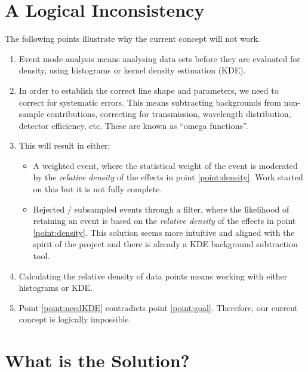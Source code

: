 \documentclass{article}
\begin{document}
\section{A Logical Inconsistency}

The following points illustrate why the current concept will not work.

\begin{enumerate}

\item \label{point:goal}Event mode analysis means analysing data sets before they are
  evaluated for density, using histograms or kernel density estimation
  (KDE).

\item \label{point:density}In order to establish the correct line shape and parameters, we
  need to correct for systematic errors.  This means subtracting
  backgrounds from non-sample contributions, correcting for
  transmission, wavelength distribution, detector efficiency, etc.
  These are known as ``omega functions''.

\item This will result in either:
  \begin{itemize}
    \item A weighted event, where the statistical weight of the event
      is moderated by the \emph{relative density} of the effects in
      point \ref{point:density}.  Work started on this but it is not fully complete.
    \item Rejected / subsampled events through a filter, where the
      likelihood of retaining an event is based on the \emph{relative
      density} of the effects in point \ref{point:density}.  This
      solution seems more intuitive and aligned with the spirit of the
      project and there is already a KDE background subtraction tool.
  \end{itemize}

\item \label{point:needKDE}Calculating the relative density of data points means working
  with either histograms or KDE.

\item Point \ref{point:needKDE} contradicts point \ref{point:goal}.
Therefore, our current concept is logically impossible.
\end{enumerate}


\section{What is the Solution?}
\end{document}
